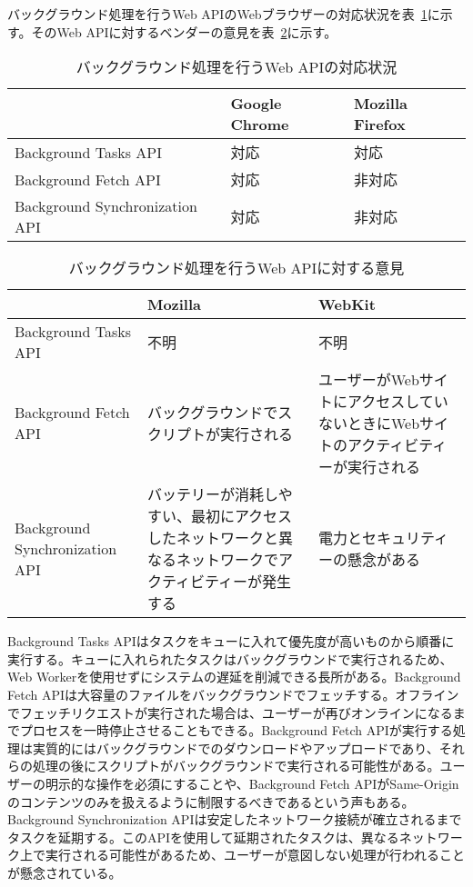 バックグラウンド処理を行うWeb APIのWebブラウザーの対応状況を表~\ref{table:バックグラウンド処理を行うWeb APIの対応状況}に示す。そのWeb APIに対するベンダーの意見を表~\ref{table:バックグラウンド処理を行うWeb APIに対する意見}に示す。
\begin{table}
  \caption{バックグラウンド処理を行うWeb APIの対応状況}\label{table:バックグラウンド処理を行うWeb APIの対応状況}
  \centering
  \begin{tabular}{|p{13em}|p{8em}|p{8em}|}
    \hline
    & Google Chrome & Mozilla Firefox \\ \hline
    Background Tasks API & \cellcolor{gray!10}対応 & \cellcolor{gray!10}対応 \\ \hline
    Background Fetch API & \cellcolor{gray!10}対応 & \cellcolor{gray!30}非対応 \\ \hline
    Background Synchronization API & \cellcolor{gray!10}対応 & \cellcolor{gray!30}非対応 \\ \hline
  \end{tabular}
\end{table}
\begin{table}
  \caption{バックグラウンド処理を行うWeb APIに対する意見}
  \label{table:バックグラウンド処理を行うWeb APIに対する意見}
    \centering
    \begin{tabular}{|p{13em}|p{13em}|p{13em}|}
        \hline
        & Mozilla & WebKit \\ \hline
        Background Tasks API & 不明 & 不明 \\ \hline
        Background Fetch API & \cellcolor{gray!30}バックグラウンドでスクリプトが実行される~\cite{MozillaBackgroundFetchAPI} & \cellcolor{gray!30}ユーザーがWebサイトにアクセスしていないときにWebサイトのアクティビティーが実行される~\cite{WebKitBackgroundFetchAPI} \\ \hline
        Background Synchronization API & \cellcolor{gray!30}バッテリーが消耗しやすい、最初にアクセスしたネットワークと異なるネットワークでアクティビティーが発生する~\cite{MozillaBackgroundSynchronizationAPI} & \cellcolor{gray!30}電力とセキュリティーの懸念がある \\ \hline
    \end{tabular}
\end{table}
Background Tasks APIはタスクをキューに入れて優先度が高いものから順番に実行する。キューに入れられたタスクはバックグラウンドで実行されるため、Web Workerを使用せずにシステムの遅延を削減できる長所がある。Background Fetch APIは大容量のファイルをバックグラウンドでフェッチする。オフラインでフェッチリクエストが実行された場合は、ユーザーが再びオンラインになるまでプロセスを一時停止させることもできる。Background Fetch APIが実行する処理は実質的にはバックグラウンドでのダウンロードやアップロードであり、それらの処理の後にスクリプトがバックグラウンドで実行される可能性がある。ユーザーの明示的な操作を必須にすることや、Background Fetch APIがSame-Originのコンテンツのみを扱えるように制限するべきであるという声もある。Background Synchronization APIは安定したネットワーク接続が確立されるまでタスクを延期する。このAPIを使用して延期されたタスクは、異なるネットワーク上で実行される可能性があるため、ユーザーが意図しない処理が行われることが懸念されている。

